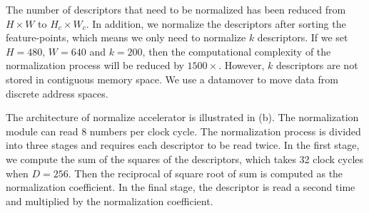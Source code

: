 The number of descriptors that need to be normalized has been reduced from $H\times W$ to $H_c\times W_c$. In addition, we normalize the descriptors after sorting the feature-points, which means we only need to normalize $k$ descriptors. If we set $H=480$, $W=640$ and $k=200$, then the computational complexity of the normalization process will be reduced by $1500\times$. However, $k$ descriptors are not stored in contiguous memory space. We use a datamover to move data from discrete address spaces.

The architecture of normalize accelerator is illustrated in (b). The normalization module can read 8 numbers per clock cycle. The normalization process is divided into three stages and requires each descriptor to be read twice. In the first stage, we compute the sum of the squares of the descriptors, which takes 32 clock cycles when $D=256$. Then the reciprocal of square root of sum is computed as the normalization coefficient. In the final stage, the descriptor is read a second time and multiplied by the normalization coefficient.





